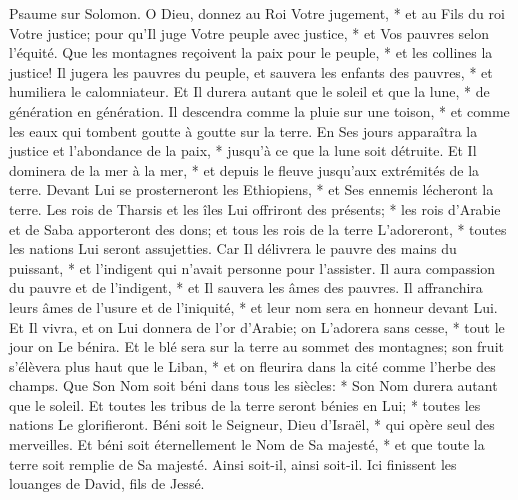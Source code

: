 Psaume sur Solomon.
O Dieu, donnez au Roi Votre jugement, * et au Fils du roi Votre justice; pour qu'Il juge Votre peuple avec justice, * et Vos pauvres selon l'équité.
Que les montagnes reçoivent la paix pour le peuple, * et les collines la justice!
Il jugera les pauvres du peuple, et sauvera les enfants des pauvres, * et humiliera le calomniateur.
Et Il durera autant que le soleil et que la lune, * de génération en génération.
Il descendra comme la pluie sur une toison, * et comme les eaux qui tombent goutte à goutte sur la terre.
En Ses jours apparaîtra la justice et l'abondance de la paix, * jusqu'à ce que la lune soit détruite.
Et Il dominera de la mer à la mer, * et depuis le fleuve jusqu'aux extrémités de la terre.
Devant Lui se prosterneront les Ethiopiens, * et Ses ennemis lécheront la terre.
Les rois de Tharsis et les îles Lui offriront des présents; * les rois d'Arabie et de Saba apporteront des dons;
et tous les rois de la terre L'adoreront, * toutes les nations Lui seront assujetties.
Car Il délivrera le pauvre des mains du puissant, * et l'indigent qui n'avait personne pour l'assister.
Il aura compassion du pauvre et de l'indigent, * et Il sauvera les âmes des pauvres.
Il affranchira leurs âmes de l'usure et de l'iniquité, * et leur nom sera en honneur devant Lui.
Et Il vivra, et on Lui donnera de l'or d'Arabie; on L'adorera sans cesse, * tout le jour on Le bénira.
Et le blé sera sur la terre au sommet des montagnes; son fruit s'élèvera plus haut que le Liban, * et on fleurira dans la cité comme l'herbe des champs.
Que Son Nom soit béni dans tous les siècles: * Son Nom durera autant que le soleil. Et toutes les tribus de la terre seront bénies en Lui; * toutes les nations Le glorifieront.
Béni soit le Seigneur, Dieu d'Israël, * qui opère seul des merveilles.
Et béni soit éternellement le Nom de Sa majesté, * et que toute la terre soit remplie de Sa majesté. Ainsi soit-il, ainsi soit-il.
Ici finissent les louanges de David, fils de Jessé.

